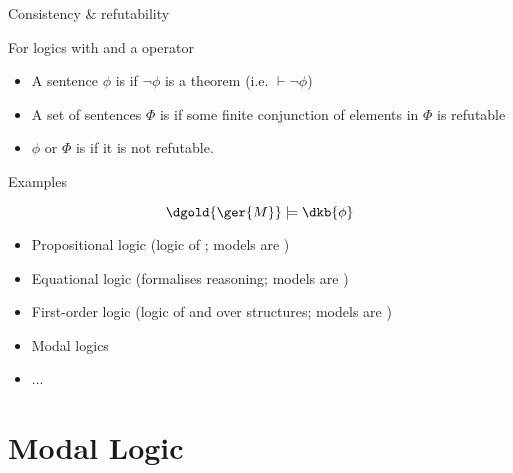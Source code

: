 \documentclass{beamer}
\begin{document}
\begin{slide}{Consistency \& refutability}\label{s:5}
\small

For logics with  and a  operator

\begin{itemize}
\item A sentence $\phi$ is  if $\neg \phi$ is a theorem (i.e. $\vdash \neg \phi$)
\item A set of sentences $\Phi$ is  if some finite conjunction of elements in $\Phi$ is refutable
\item $\phi$ or $\Phi$ is  if it is not refutable.
\end{itemize}

\end{slide}

\begin{slide}{Examples}\label{s:6}
\small

$$ \dgold{\ger{M}} \models \dkb{\phi} $$

\begin{itemize}
\item Propositional logic (logic of ; models are )
\item Equational logic (formalises  reasoning; models are )
\item First-order logic (logic of  and  over structures; models are )
\item Modal logics 
\item ...
\end{itemize}

\end{slide}

\section{Modal Logic}
\end{document}
